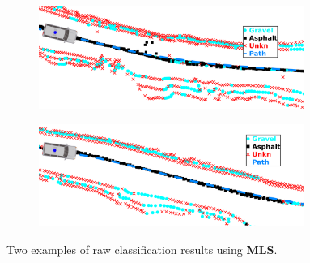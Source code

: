 \documentclass[numbered,pdftex]{ohio-etd}
\begin{document}
{{		%
		\begin{figure}[H]
			\centering
			\begin{subfigure}[b]{\textwidth}
				\centering
				\includegraphics[width=0.95\textwidth]{Defense_Images/db1mls}
				\caption{}
				\label{fig:db1mls}
			\end{subfigure}
			\vspace{1cm} %
			\begin{subfigure}[b]{\textwidth}
				\centering
				\includegraphics[width=0.95\textwidth]{Defense_Images/db2mls}
				\caption{}
				\label{fig:db2mls}
			\end{subfigure}
			\caption[Raw Result Example - MLS Spatial Reference Point]{Two examples of raw classification results using \textbf{MLS}. }
			\label{fig:mls_raw_results_example}
		\end{figure}
		
}}
\end{document}

